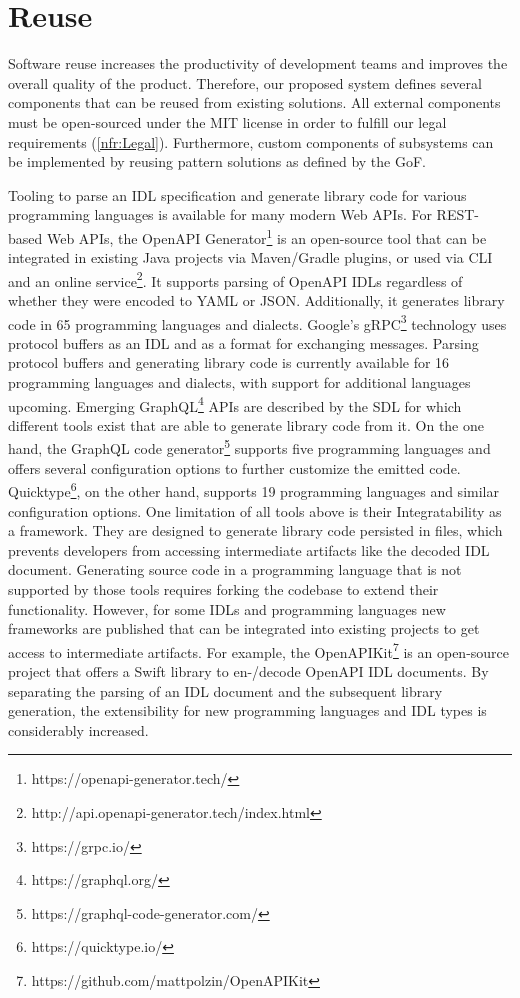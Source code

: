 \section{Reuse}
\label{sec:Reuse}

 Software reuse increases the productivity of development teams and improves the overall quality of the product. Therefore, our proposed system defines several components that can be reused from existing solutions. All external components must be open-sourced under the MIT license in order to fulfill our legal requirements (\ref{nfr:Legal}). Furthermore, custom components of subsystems can be implemented by reusing pattern solutions as defined by the \ac{GoF}. 
 
 Tooling to parse an IDL specification and generate library code for various programming languages is available for many modern Web APIs. For REST-based Web APIs, the OpenAPI Generator\footnote{https://openapi-generator.tech/} is an open-source tool that can be integrated in existing Java projects via Maven/Gradle plugins, or used via CLI and an online service\footnote{http://api.openapi-generator.tech/index.html}. It supports parsing of OpenAPI IDLs regardless of whether they were encoded to YAML or JSON. Additionally, it generates library code in 65 programming languages and dialects. Google's gRPC\footnote{https://grpc.io/} technology uses protocol buffers as an IDL and as a format for exchanging messages. Parsing protocol buffers and generating library code is currently available for 16 programming languages and dialects, with support for additional languages upcoming. Emerging GraphQL\footnote{https://graphql.org/} APIs are described by the \ac{SDL} for which different tools exist that are able to generate library code from it. On the one hand, the GraphQL code generator\footnote{https://graphql-code-generator.com/} supports five programming languages and offers several configuration options to further customize the emitted code. Quicktype\footnote{https://quicktype.io/}, on the other hand, supports 19 programming languages and similar configuration options. One limitation of all tools above is their Integratability as a framework. They are designed to generate library code persisted in files, which prevents developers from accessing intermediate artifacts like the decoded IDL document. Generating source code in a programming language that is not supported by those tools requires forking the codebase to extend their functionality. However, for some IDLs and programming languages new frameworks are published that can be integrated into existing projects to get access to intermediate artifacts. For example, the OpenAPIKit\footnote{https://github.com/mattpolzin/OpenAPIKit} is an open-source project that offers a Swift library to en-/decode OpenAPI IDL documents. By separating the parsing of an IDL document and the subsequent library generation, the extensibility for new programming languages and IDL types is considerably increased. 
 
